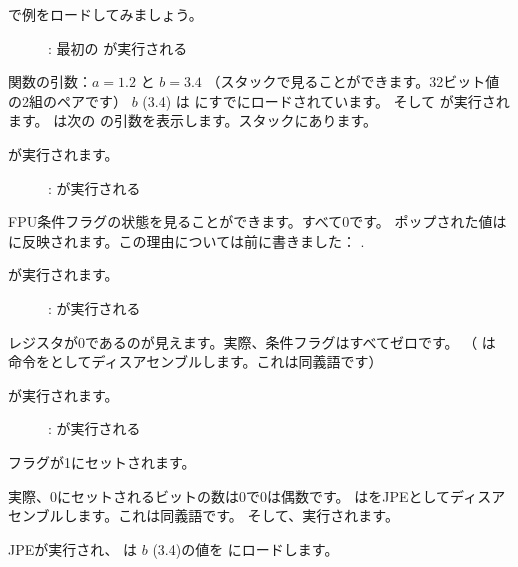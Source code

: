 ﻿\clearpage
{}
\myindex{\olly}

\olly で例をロードしてみましょう。

\begin{figure}[H]
\centering
{}
\caption{\olly: 最初の \FLD が実行される}
\label{fig:FPU_comparison_case1_olly1}
\end{figure}

関数の引数：$a=1.2$ と $b=3.4$ （スタックで見ることができます。32ビット値の2組のペアです）
$b$ (3.4) は にすでにロードされています。
そして \FCOMP が実行されます。
\olly は次の \FCOMP の引数を表示します。スタックにあります。

\clearpage
\FCOMP が実行されます。

\begin{figure}[H]
\centering
{}
\caption{\olly: \FCOMP が実行される}
\label{fig:FPU_comparison_case1_olly2}
\end{figure}

\ac{FPU}条件フラグの状態を見ることができます。すべて0です。
ポップされた値はに反映されます。この理由については前に書きました：
.

\clearpage
\FNSTSW が実行されます。
\begin{figure}[H]
\centering
{}
\caption{\olly: \FNSTSW が実行される}
\label{fig:FPU_comparison_case1_olly3}
\end{figure}

レジスタが0であるのが見えます。実際、条件フラグはすべてゼロです。
（ \olly は \FNSTSW 命令をとしてディスアセンブルします。これは同義語です）

\clearpage
\TEST が実行されます。

\begin{figure}[H]
\centering
{}
\caption{\olly: \TEST が実行される}
\label{fig:FPU_comparison_case1_olly4}
\end{figure}

フラグが1にセットされます。

実際、0にセットされるビットの数は0で0は偶数です。
\olly はを\ac{JPE}としてディスアセンブルします。これは同義語です。
そして、実行されます。

\clearpage
\ac{JPE}が実行され、 \FLD は $b$ (3.4)の値を にロードします。

